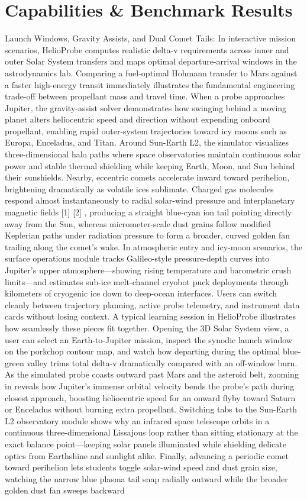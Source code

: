 \documentclass[10pt,letterpaper]{article}
\begin{document}
\section{Capabilities \& Benchmark Results}
Launch Windows, Gravity Assists, and Dual Comet Tails: In interactive mission scenarios, HelioProbe computes realistic delta-v requirements across inner and outer Solar System transfers and maps optimal departure-arrival windows in the astrodynamics lab. Comparing a fuel-optimal Hohmann transfer to Mars against a faster high-energy transit immediately illustrates the fundamental engineering trade-off between propellant mass and travel time. When a probe approaches Jupiter, the gravity-assist solver demonstrates how swinging behind a moving planet alters heliocentric speed and direction without expending onboard propellant, enabling rapid outer-system trajectories toward icy moons such as Europa, Enceladus, and Titan. Around Sun-Earth L2, the simulator visualizes three-dimensional halo paths where space observatories maintain continuous solar power and stable thermal shielding while keeping Earth, Moon, and Sun behind their sunshields. Nearby, eccentric comets accelerate inward toward perihelion, brightening dramatically as volatile ices sublimate. Charged gas molecules respond almost instantaneously to radial solar-wind pressure and interplanetary magnetic fields [1] [2] , producing a straight blue-cyan ion tail pointing directly away from the Sun, whereas micrometer-scale dust grains follow modified Keplerian paths under radiation pressure to form a broader, curved golden fan trailing along the comet's wake. In atmospheric entry and icy-moon scenarios, the surface operations module tracks Galileo-style pressure-depth curves into Jupiter's upper atmosphere---showing rising temperature and barometric crush limits---and estimates sub-ice melt-channel cryobot puck deployments through kilometers of cryogenic ice down to deep-ocean interfaces. Users can switch cleanly between trajectory planning, active probe telemetry, and instrument data cards without losing context. A typical learning session in HelioProbe illustrates how seamlessly these pieces fit together. Opening the 3D Solar System view, a user can select an Earth-to-Jupiter mission, inspect the synodic launch window on the porkchop contour map, and watch how departing during the optimal blue-green valley trims total delta-v dramatically compared with an off-window burn. As the simulated probe coasts outward past Mars and the asteroid belt, zooming in reveals how Jupiter's immense orbital velocity bends the probe's path during closest approach, boosting heliocentric speed for an onward flyby toward Saturn or Enceladus without burning extra propellant. Switching tabs to the Sun-Earth L2 observatory module shows why an infrared space telescope orbits in a continuous three-dimensional Lissajous loop rather than sitting stationary at the exact balance point---keeping solar panels illuminated while shielding delicate optics from Earthshine and sunlight alike. Finally, advancing a periodic comet toward perihelion lets students toggle solar-wind speed and dust grain size, watching the narrow blue plasma tail snap radially outward while the broader golden dust fan sweeps backward 
\end{document}
